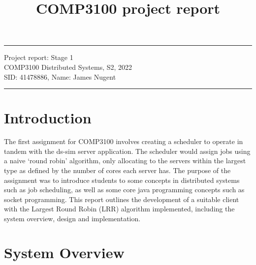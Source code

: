 \documentclass[a4paper]{article} %
\begin{document}

\title{COMP3100 project report} %
\fancyhead[C]{}
\hrule \medskip %
\begin{minipage}{1\textwidth} %
\centering 
\large %
Project report: Stage 1\\ %
COMP3100 Distributed Systems, S2, 2022\\
\normalsize %
SID: 41478886, Name: James Nugent
\end{minipage}
\medskip\hrule %
\bigskip


\section*{Introduction}
The first assignment for COMP3100 involves creating a scheduler to operate in tandem with the ds-sim server application.
The scheduler would assign jobs using a naive `round robin' algorithm, only allocating to the servers within the largest type as defined by the number of cores each server has.
The purpose of the assignment was to introduce students to some concepts in distributed systems such as job scheduling, as well as some core java programming concepts such as socket programming.
This report outlines the development of a suitable client with the Largest Round Robin (LRR) algorithm implemented, including the system overview, design and implementation.

\section*{System Overview}
\end{document}

